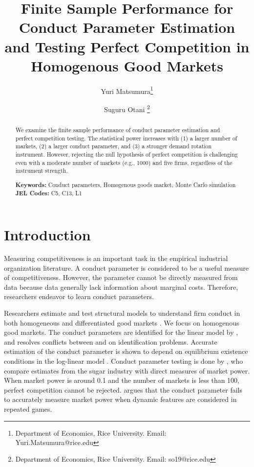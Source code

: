 \documentclass[11pt, a4paper]{article}
\title{Finite Sample Performance for Conduct Parameter Estimation and Testing Perfect Competition in Homogenous Good Markets}
\author{Yuri Matsumura\thanks{Department of Economics, Rice University. Email: Yuri.Matsumura@rice.edu} \and Suguru Otani \thanks{Department of Economics, Rice University. Email: so19@rice.edu
}}
\begin{document}
\maketitle
\begin{abstract}
    We examine the finite sample performance of conduct parameter estimation and perfect competition testing. The statistical power increases with (1) a larger number of markets, (2) a larger conduct parameter, and (3) a stronger demand rotation instrument. However, rejecting the null hypothesis of perfect competition is challenging even with a moderate number of markets (e.g., 1000) and five firms, regardless of the instrument strength.
\vspace{0.1in}

\noindent\textbf{Keywords:} Conduct parameters, Homogenous goods market, Monte Carlo simulation
\vspace{0in}
\newline
\noindent\textbf{JEL Codes:} C5, C13, L1

\bigskip
\end{abstract}


\section{Introduction}
Measuring competitiveness is an important task in the empirical industrial organization literature.
A conduct parameter is considered to be a useful measure of competitiveness. 
However, the parameter cannot be directly measured from data because data generally lack information about marginal costs.
Therefore, researchers endeavor to learn conduct parameters.

Researchers estimate and test structural models to understand firm conduct in both homogeneous and differentiated good markets \citep{nevoIdentificationOligopolySolution1998, magnolfi2022comparison, duarte2023testing}. 
We focus on homogenous good markets. 
The conduct parameters are identified for the linear model by \citet{bresnahan1982oligopoly}, and \cite{matsumura2023resolving} resolves conflicts between \cite{bresnahan1982oligopoly} and \cite{perloff2012collinearity} on identification problems. Accurate estimation of the conduct parameter is shown to depend on equilibrium existence conditions in the log-linear model \citep{matsumura2023mpec}. Conduct parameter testing is done by \cite{genesove1998testing}, who compare estimates from the sugar industry with direct measures of market power. When market power is around 0.1 and the number of markets is less than 100, perfect competition cannot be rejected. \cite{corts1999conduct} argues that the conduct parameter fails to accurately measure market power when dynamic features are considered in repeated games.
\end{document}
